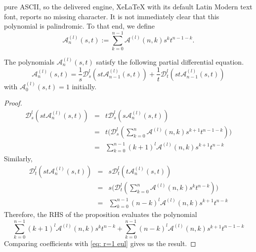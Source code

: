 \documentclass[10pt,a4paper]{amsart}
\newcommand{\dd}{\mathcal{D}}
\newcommand{\eul}{\mathcal{A}}
\begin{document}
pure ASCII, so the delivered engine, XeLaTeX with its default Latin Modern text font, reports no missing character.
It is not immediately clear that this polynomial is palindromic. To that end, we define \begin{equation}\label{eq: r=1 eul}
     \eul_n^{(l)}(s,t):= \displaystyle \sum_{k=0}^{n-1} \eul^{(l)}(n,k)s^kt^{n-1-k}.
\end{equation} 

\begin{proposition}\label{prop: diff-recurrence}
    The polynomials $\eul^{(l)}_n(s,t)$ satisfy the following partial differential equation.
    \begin{equation}
        \eul^{(l)}_n(s,t)= \frac{1}{s} \dd_s^l(st\eul^{(l)}_{n-1}(s,t))+ \frac{1}{t} \dd_t^l(st\eul^{(l)}_{n-1}(s,t))
    \end{equation}
    with $\eul^{(l)}_0(s,t)=1$ initially.
\end{proposition}

\begin{proof}
    \begin{eqnarray*}
        \dd_s^l(st\eul^{(l)}_{n}(s,t)) & = & t \dd_s^l(s\eul^{(l)}_{n}(s,t))\\
        & = & t\bigg( \dd_s^l(\sum_{k=0}^{n} \eul^{(l)}(n,k) s^{k+1} t^{n-1-k}) \bigg)\\ 
        & = & \sum_{k=0}^{n-1}(k+1)^l\eul^{(l)}(n,k) s^{k+1} t^{n-k}
    \end{eqnarray*}
    Similarly,
    \begin{eqnarray*}
        \dd_t^l(st\eul^{(l)}_{n}(s,t)) & = & s \dd_t^l(t\eul^{(l)}_{n}(s,t))\\
        & = & s\bigg( \dd_t^l(\sum_{k=0}^{n} \eul^{(l)}(n,k) s^{k} t^{n-k}) \bigg)\\ 
        & = & \sum_{k=0}^{n-1}(n-k)^l\eul^{(l)}(n,k) s^{k+1} t^{n-k}
    \end{eqnarray*}
    Therefore, the RHS of the proposition evaluates the polynomial
    \begin{equation*}
        \sum_{k=0}^{n-1}(k+1)^l\eul^{(l)}(n,k) s^{k} t^{n-k}+\sum_{k=0}^{n-1}(n-k)^l\eul^{(l)}(n,k) s^{k+1} t^{n-1-k}
    \end{equation*}
    Comparing coefficients with \eqref{eq: r=1 eul} gives us the result. 
\end{proof}
\end{document}
